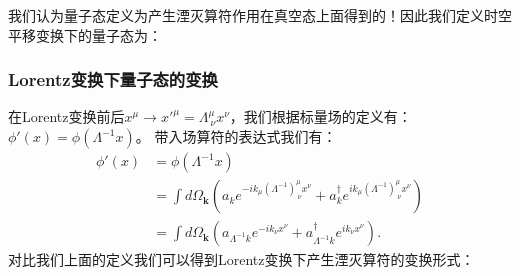 \bigskip
{}

我们认为量子态定义为产生湮灭算符作用在真空态上面得到的！因此我们定义时空平移变换下的量子态为：

\subsubsection{Lorentz变换下量子态的变换}

在Lorentz变换前后$ x ^\mu \to x'^\mu = \Lambda^\mu_{\ \nu}x^\nu
$，我们根据标量场的定义有：$ \phi'(x) = \phi(\Lambda^{-1}x) $。 带入场算符的表达式我们有：
\begin{align}
  \phi'(x) &= \phi(\Lambda^{-1}x) \\
  &= \int d\Omega_\mathbf{k}\left(a_k e^{-ik_\mu
    (\Lambda^{-1})^\mu_{\ \nu} x^\nu} + a_k^\dagger e^{ik_\mu
  (\Lambda^{-1})^\mu_{\ \nu} x^\nu}\right) \\
  & = \int d \Omega_{\mathbf{k}}\left(a_{\Lambda^{-1}k} e^{-ik_\nu
  x^\nu} + a_{\Lambda^{-1}k}^\dagger e^{ik_\nu x^\nu}\right).
\end{align}
对比我们上面的定义我们可以得到Lorentz变换下产生湮灭算符的变换形式：

\bigskip
{}

